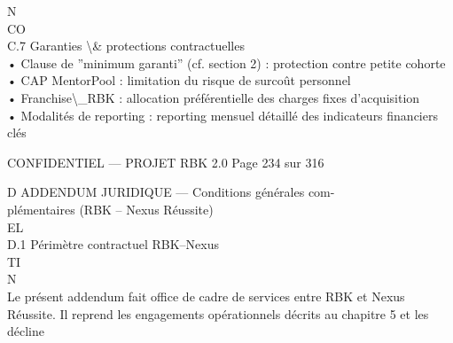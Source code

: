 \vspace{0.5em}
\vspace{0.5em}
N\\
CO\\
C.7 Garanties \textbackslash{}& protections contractuelles\\
• Clause de ”minimum garanti” (cf. section 2) : protection contre petite cohorte\\
\vspace{0.5em}
• CAP MentorPool : limitation du risque de surcoût personnel\\
\vspace{0.5em}
• Franchise\textbackslash{}_RBK : allocation préférentielle des charges fixes d’acquisition\\
\vspace{0.5em}
• Modalités de reporting : reporting mensuel détaillé des indicateurs financiers clés\\
\vspace{0.5em}
\vspace{0.5em}
\vspace{0.5em}
\vspace{0.5em}
\begin{confidential}CONFIDENTIEL — PROJET RBK 2.0                                            Page 234 sur 316\end{confidential}
D \textbar{} ADDENDUM JURIDIQUE — Conditions générales com-\\
plémentaires (RBK – Nexus Réussite)\\
\vspace{0.5em}
\vspace{0.5em}
\vspace{0.5em}
\vspace{0.5em}
EL\\
D.1 Périmètre contractuel RBK–Nexus\\
\vspace{0.5em}
\vspace{0.5em}
\vspace{0.5em}
\vspace{0.5em}
TI\\
N\\
Le présent addendum fait office de cadre de services entre RBK et Nexus Réussite. Il reprend les engagements opérationnels décrits au chapitre 5 et les décline\\
\vspace{0.5em}
\vspace{0.5em}
\vspace{0.5em}
\vspace{0.5em}
